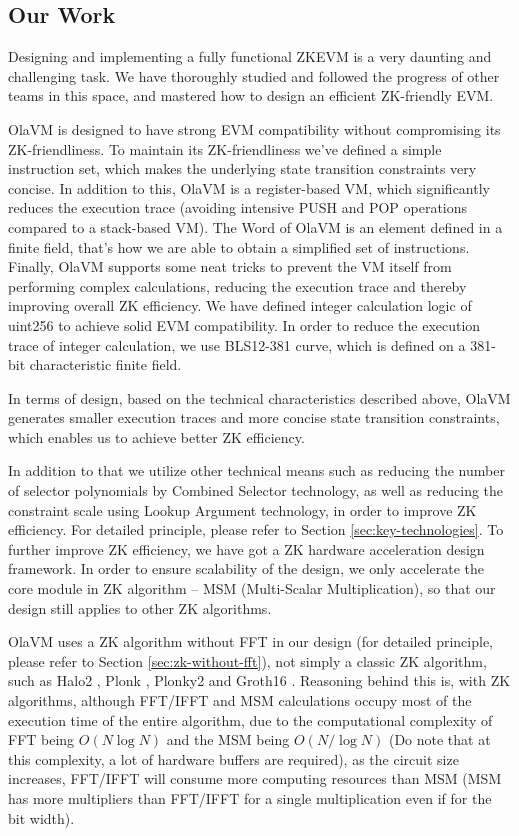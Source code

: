 \subsection{Our Work}

Designing and implementing a fully functional ZKEVM is a very daunting and challenging task. We have thoroughly studied and followed the progress of other teams in this space, and mastered how to design an efficient ZK-friendly EVM.

OlaVM is designed to have strong EVM compatibility without compromising its ZK-friendliness. To maintain its ZK-friendliness we've defined a simple instruction set, which makes the underlying state transition constraints very concise. In addition to this, OlaVM is a register-based VM, which significantly reduces the execution trace (avoiding intensive PUSH and POP operations compared to a stack-based VM). The Word of OlaVM is an element defined in a finite field, that's how we are able to obtain a simplified set of instructions. Finally, OlaVM supports some neat tricks to prevent the VM itself from performing complex calculations, reducing the execution trace and thereby improving overall ZK efficiency. We have defined integer calculation logic of uint256 to achieve solid EVM compatibility. In order to reduce the execution trace of integer calculation, we use BLS12-381 curve, which is defined on a 381-bit characteristic finite field.

In terms of design, based on the technical characteristics described above, OlaVM generates smaller execution traces and more concise state transition constraints, which enables us to achieve better ZK efficiency.

In addition to that we utilize other technical means such as reducing the number of selector polynomials by Combined Selector technology, as well as reducing the constraint scale using Lookup Argument technology, in order to improve ZK efficiency. For detailed principle, please refer to Section \ref{sec:key-technologies}. To further improve ZK efficiency, we have got a ZK hardware acceleration design framework. In order to ensure scalability of the design, we only accelerate the core module in ZK algorithm -- MSM (Multi-Scalar Multiplication), so that our design still applies to other ZK algorithms.

OlaVM uses a ZK algorithm without FFT in our design (for detailed principle, please refer to Section \ref{sec:zk-without-fft}), not simply a classic ZK algorithm, such as Halo2 \cite{website:halo2}, Plonk \cite{cryptoeprint:2019/953}, Plonky2 \cite{website:plonky2} and Groth16 \cite{Groth16}. Reasoning behind this is, with ZK algorithms, although FFT/IFFT and MSM calculations occupy most of the execution time of the entire algorithm, due to the computational complexity of FFT being $O(N\log N)$ and the MSM being $O(N/\log N)$ (Do note that at this complexity, a lot of hardware buffers are required), as the circuit size increases, FFT/IFFT will consume more computing resources than MSM (MSM has more multipliers than FFT/IFFT for a single multiplication even if for the bit width).

